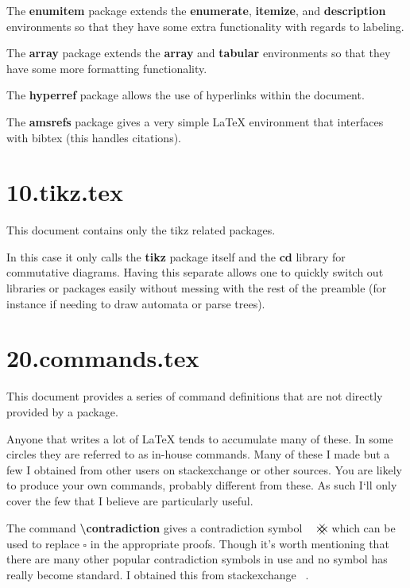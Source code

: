       The \textbf{enumitem} package extends the \textbf{enumerate}, \textbf{itemize}, and \textbf{description} environments so that they have some extra functionality with regards to labeling.  
            
      The \textbf{array} package extends the \textbf{array} and \textbf{tabular} environments so that they have some more formatting functionality.

      The \textbf{hyperref} package allows the use of hyperlinks within the document. 

      The \textbf{amsrefs} package gives a very simple \LaTeX{} environment that interfaces with bibtex (this handles citations).

  \section{10.tikz.tex}\label{tikz}
    
    This document contains only the tikz related packages.

    In this case it only calls the \textbf{tikz} package itself and the \textbf{cd} library for commutative diagrams. Having this separate allows one to quickly switch out libraries or packages easily without messing with the rest of the preamble (for instance if needing to draw automata or parse trees).
  
  \section{20.commands.tex}\label{commands}

    This document provides a series of command definitions that are not directly provided by a package.

    Anyone that writes a lot of \LaTeX{} tends to accumulate many of these. In some circles they are referred to as in-house commands. Many of these I made but a few I obtained from other users on stackexchange or other sources. You are likely to produce your own commands, probably different from these. As such I`ll only cover the few that I believe are particularly useful.

    The command \textbf{\textbackslash contradiction} gives a contradiction symbol $\contradiction$ which can be used to replace $\square$ in the appropriate proofs. Though it's worth mentioning that there are many other popular contradiction symbols in use and no symbol has really become standard. I obtained this from stackexchange ~\cite{contradiction}.

